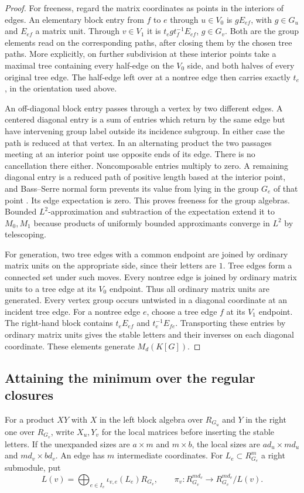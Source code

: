 \documentclass[11pt,a4paper,reqno]{amsart}
\numberwithin{equation}{section}
\theoremstyle{remark}
\begin{document}
\begin{proof}
For freeness, regard the matrix coordinates as points in the interiors of edges. An elementary block entry from \(f\) to \(e\) through \(u\in V_0\) is \(gE_{ef}\), with \(g\in G_u\) and \(E_{ef}\) a matrix unit. Through \(v\in V_1\) it is \(t_eg t_f^{-1}E_{ef}\), \(g\in G_v\). Both are the group elements read on the corresponding paths, after closing them by the chosen tree paths. More explicitly, on further subdivision at these interior points take a maximal tree containing every half-edge on the \(V_0\) side, and both halves of every original tree edge. The half-edge left over at a nontree edge then carries exactly \(t_e\), in the orientation used above.

An off-diagonal block entry passes through a vertex by two different edges. A centered diagonal entry is a sum of entries which return by the same edge but have intervening group label outside its incidence subgroup. In either case the path is reduced at that vertex. In an alternating product the two passages meeting at an interior point use opposite ends of its edge. There is no cancellation there either. Noncomposable entries multiply to zero. A remaining diagonal entry is a reduced path of positive length based at the interior point, and Bass--Serre normal form prevents its value from lying in the group \(G_e\) of that point \cite[Chapter~I, \S5]{Serre}. Its edge expectation is zero. This proves freeness for the group algebras. Bounded \(L^2\)-approximation and subtraction of the expectation extend it to \(M_0,M_1\) because products of uniformly bounded approximants converge in \(L^2\) by telescoping.

For generation, two tree edges with a common endpoint are joined by ordinary matrix units on the appropriate side, since their letters are \(1\). Tree edges form a connected set under such moves. Every nontree edge is joined by ordinary matrix units to a tree edge at its \(V_0\) endpoint. Thus all ordinary matrix units are generated. Every vertex group occurs untwisted in a diagonal coordinate at an incident tree edge. For a nontree edge \(e\), choose a tree edge \(f\) at its \(V_1\) endpoint. The right-hand block contains \(t_eE_{ef}\) and \(t_e^{-1}E_{fe}\). Transporting these entries by ordinary matrix units gives the stable letters and their inverses on each diagonal coordinate. These elements generate \(M_d(K[G])\).
\end{proof}



\subsection{Attaining the minimum over the regular closures}
For a product \(XY\) with \(X\) in the left block algebra over \(R_{G_u}\) and \(Y\) in the right one over \(R_{G_v}\), write \(X_u,Y_v\) for the local matrices before inserting the stable letters. If the unexpanded sizes are \(a\times m\) and \(m\times b\), the local sizes are \(ad_u\times md_u\) and \(md_v\times bd_v\). An edge has \(m\) intermediate coordinates. For \(L_e\subset R_{G_e}^m\) a right submodule, put
\[
 L(v)=\bigoplus_{e\in I_v}\iota_{v,e}(L_e)R_{G_v},
 \qquad \pi_v:R_{G_v}^{md_v}\longrightarrow R_{G_v}^{md_v}/L(v).
\]
\end{document}
